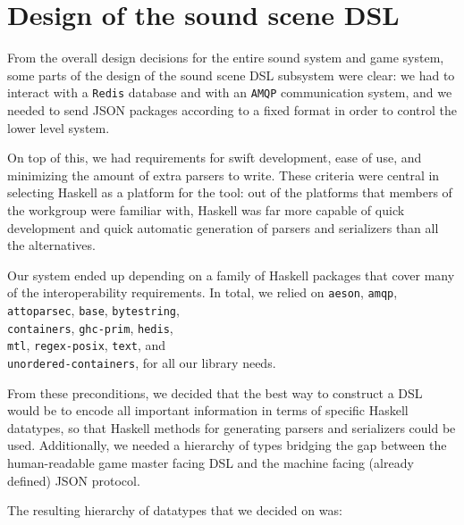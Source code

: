 \section{Design of the sound scene DSL}
\label{sec:design-sound-spec}


From the overall design decisions for the entire sound system and game
system, some parts of the design of the sound scene DSL subsystem were
clear: we had to interact with a \texttt{Redis} database and with
an \texttt{AMQP} communication system, and we needed to send JSON packages according to a
fixed format in order to control the lower level system.

On top of this, we had requirements for swift development, ease of
use, and minimizing the amount of extra parsers to write. These
criteria were central in selecting Haskell as a platform for the tool:
out of the platforms that members of the workgroup were familiar with,
Haskell was far more capable of quick development and quick automatic
generation of parsers and serializers than all the alternatives. 

Our system ended up depending on a family of Haskell packages that
cover many of the interoperability requirements. In total, we relied
on 
\texttt{aeson}\cite{aeson}, 
\texttt{amqp}\cite{amqp}, 
\texttt{attoparsec}\cite{attoparsec}, 
\texttt{base}\cite{haskell}, 
\texttt{bytestring}\cite{bytestring}, \\
\texttt{containers}\cite{containers}, 
\texttt{ghc-prim}\cite{haskell}, 
\texttt{hedis}\cite{hedis}, \\
\texttt{mtl}\cite{mtl}, 
\texttt{regex-posix}\cite{regex-posix}, 
\texttt{text}\cite{text}, and\\
\texttt{unordered-containers}\cite{unordered-containers}, 
for all our library needs.

From these preconditions, we decided that the best way to construct a
DSL would be to encode all important information in
terms of specific Haskell datatypes, so that Haskell methods for
generating parsers and serializers could be used. Additionally,
we needed a hierarchy of types bridging the gap
between the human-readable game master facing DSL and the machine facing
(already defined) JSON protocol.

The resulting hierarchy of datatypes that we decided on was:\nopagebreak

